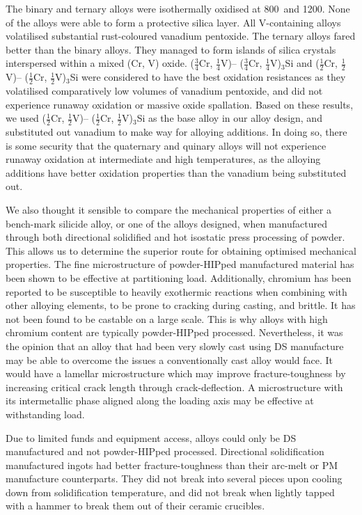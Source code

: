 The binary and ternary alloys were isothermally oxidised at 800\celsius\ and 1200\celsius.  None of the alloys were able to form a protective silica layer.  All V-containing alloys volatilised substantial rust-coloured vanadium pentoxide.  The ternary alloys fared better than the binary alloys.  They managed to form islands of silica crystals interspersed within a mixed (Cr, V) oxide.  ($\frac{3}{4}$Cr, $\frac{1}{4}$V)-- ($\frac{3}{4}$Cr, $\frac{1}{4}$V)$_3$Si and ($\frac{1}{2}$Cr, $\frac{1}{2}$V)-- ($\frac{1}{2}$Cr, $\frac{1}{2}$V)$_3$Si were considered to have the best oxidation resistances as they volatilised comparatively low volumes of vanadium pentoxide, and did not experience runaway oxidation or massive oxide spallation.  Based on these results, we used ($\frac{1}{2}$Cr, $\frac{1}{2}$V)-- ($\frac{1}{2}$Cr, $\frac{1}{2}$V)$_3$Si as the base alloy in our alloy design, and substituted out vanadium to make way for alloying additions.  In doing so, there is some security that the quaternary and quinary alloys will not experience runaway oxidation at intermediate and high temperatures, as the alloying additions have better oxidation properties than the vanadium being substituted out.

We also thought it sensible to compare the mechanical properties of either a bench-mark silicide alloy, or one of the alloys designed, when manufactured through both directional solidified and hot isostatic press processing of powder.  This allows us to determine the superior route for obtaining optimised mechanical properties.  The fine microstructure of powder-HIPped manufactured material has been shown to be effective at partitioning load.  Additionally, chromium has been reported to be susceptible to heavily exothermic reactions when combining with other alloying elements, to be prone to cracking during casting, and brittle.  It has not been found to be castable on a large scale.  This is why alloys with high chromium content are typically powder-HIPped processed.  Nevertheless, it was the opinion that an alloy that had been very slowly cast using DS manufacture may be able to overcome the issues a conventionally cast alloy would face.  It would have a lamellar microstructure which may improve fracture-toughness by increasing critical crack length through crack-deflection.  A microstructure with its intermetallic phase aligned along the loading axis may be effective at withstanding load.  

Due to limited funds and equipment access, alloys could only be DS manufactured and not powder-HIPped processed.  Directional solidification manufactured ingots had better fracture-toughness than their arc-melt or PM manufacture counterparts.  They did not break into several pieces upon cooling down from solidification temperature, and did not break when lightly tapped with a hammer to break them out of their ceramic crucibles. 

